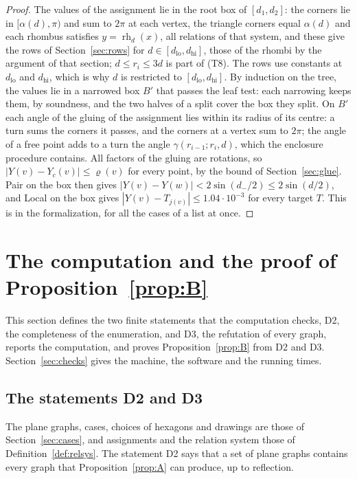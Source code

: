 \documentclass[12pt]{amsart}
\theoremstyle{definition}
\theoremstyle{plain}
\theoremstyle{definition}
\newcommand{\dlo}{d_{\mathrm{lo}}}
\newcommand{\dhi}{d_{\mathrm{hi}}}
\begin{document}
\begin{proof}
The values of the assignment lie in the root box of $[d_1,d_2]$: the corners lie in $[\alpha(d),\pi)$ and sum to $2\pi$ at each vertex, the triangle corners equal $\alpha(d)$ and each rhombus satisfies $y=\operatorname{rh}_d(x)$, all relations of that system, and these give the rows of Section~\ref{sec:rows} for $d\in[\dlo,\dhi]$, those of the rhombi by the argument of that section; $d\le r_i\le3d$ is part of (T8). The rows use constants at $\dlo$ and $\dhi$, which is why $d$ is restricted to $[\dlo,\dhi]$. By induction on the tree, the values lie in a narrowed box $B'$ that passes the leaf test: each narrowing keeps them, by soundness, and the two halves of a split cover the box they split. On $B'$ each angle of the gluing of the assignment lies within its radius of its centre: a turn sums the corners it passes, and the corners at a vertex sum to $2\pi$; the angle of a free point adds to a turn the angle $\gamma(r_{i-1};r_i,d)$, which the enclosure procedure contains. All factors of the gluing are rotations, so $|Y(v)-Y_c(v)|\le\varrho(v)$ for every point, by the bound of Section~\ref{sec:glue}. Pair on the box then gives $|Y(v)-Y(w)|<2\sin(d_-/2)\le2\sin(d/2)$, and Local on the box gives $|Y(v)-T_{j(v)}|\le1.04\cdot10^{-3}$ for every target $T$. This is  in the formalization, for all the cases of a list at once.
\end{proof}

\section{The computation and the proof of Proposition~\ref{prop:B}}\label{sec:comp}

This section defines the two finite statements that the computation checks, D2, the completeness of the enumeration, and D3, the refutation of every graph, reports the computation, and proves Proposition~\ref{prop:B} from D2 and D3. Section~\ref{sec:checks} gives the machine, the software and the running times.

\subsection{The statements D2 and D3}\label{sec:leanhyps}
The plane graphs, cases, choices of hexagons and drawings are those of Section~\ref{sec:cases}, and assignments and the relation system those of Definition~\ref{def:relsys}. The statement D2 says that a set of plane graphs contains every graph that Proposition~\ref{prop:A} can produce, up to reflection.
\end{document}

